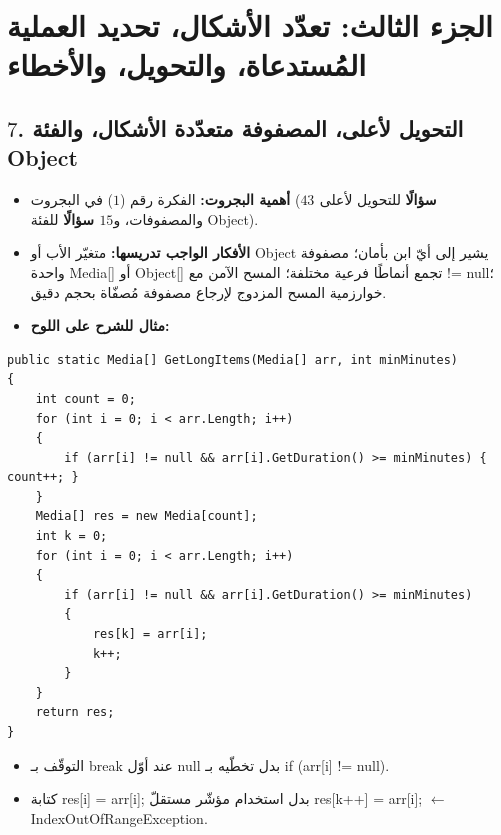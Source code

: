 \documentclass[14pt]{extarticle}
\begin{document}
\clearpage
\section*{الجزء الثالث: تعدّد الأشكال، تحديد العملية المُستدعاة، والتحويل، والأخطاء}

\subsection*{$7$. التحويل لأعلى، المصفوفة متعدّدة الأشكال، والفئة \textenglish{Object}}
\begin{itemize}[itemsep=0.25em]
    \item \textbf{أهمية البجروت:} الفكرة رقم ($1$) في البجروت (\textbf{$43$ سؤالًا} للتحويل لأعلى والمصفوفات، و\textbf{$15$ سؤالًا} للفئة \textenglish{Object}).
    \item \textbf{الأفكار الواجب تدريسها:} متغيّر الأب أو \textenglish{Object} يشير إلى أيّ ابن بأمان؛ مصفوفة واحدة \textenglish{Media[]} أو \textenglish{Object[]} تجمع أنماطًا فرعية مختلفة؛ المسح الآمن مع \textenglish{!= null}؛ خوارزمية المسح المزدوج لإرجاع مصفوفة مُصفّاة بحجم دقيق.
    \item \textbf{مثال للشرح على اللوح:}
\end{itemize}
\begin{boxCode}
\begin{english}
\begin{verbatim}
public static Media[] GetLongItems(Media[] arr, int minMinutes)
{
    int count = 0;
    for (int i = 0; i < arr.Length; i++)
    {
        if (arr[i] != null && arr[i].GetDuration() >= minMinutes) { count++; }
    }
    Media[] res = new Media[count];
    int k = 0;
    for (int i = 0; i < arr.Length; i++)
    {
        if (arr[i] != null && arr[i].GetDuration() >= minMinutes)
        {
            res[k] = arr[i];
            k++;
        }
    }
    return res;
}
\end{verbatim}
\end{english}
\end{boxCode}
\begin{boxWarning}
\begin{itemize}
    \item التوقّف بـ \textenglish{break} عند أوّل \textenglish{null} بدل تخطّيه بـ \textenglish{if (arr[i] != null)}.
    \item كتابة \textenglish{res[i] = arr[i];} بدل استخدام مؤشّر مستقلّ \textenglish{res[k++] = arr[i];} $\leftarrow$ \textenglish{IndexOutOfRangeException}.
\end{itemize}
\end{boxWarning}
\end{document}
